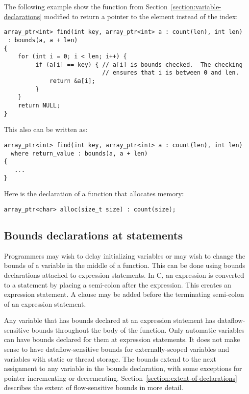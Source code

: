 The following example show the  function from
Section~\ref{section:variable-declarations} modified
to return a pointer to the element instead of the index:

\begin{lstlisting}
array_ptr<int> find(int key, array_ptr<int> a : count(len), int len)
 : bounds(a, a + len)
{
    for (int i = 0; i < len; i++) {
         if (a[i] == key) { // a[i] is bounds checked.  The checking
                            // ensures that i is between 0 and len.
             return &a[i];
         }
    }
    return NULL;
}
\end{lstlisting}

This also can be written as:

\begin{lstlisting}
array_ptr<int> find(int key, array_ptr<int> a : count(len), int len)
  where return_value : bounds(a, a + len)
{
   ...
}
\end{lstlisting}
Here is the declaration of a function that allocates memory:

\begin{lstlisting}
array_ptr<char> alloc(size_t size) : count(size);
\end{lstlisting}



\subsection{Bounds declarations at statements}
\label{section:statement-declarations}

Programmers may wish to delay initializing variables or may wish to
change the bounds of a variable in the middle of a function. This can be
done using bounds declarations attached to expression statements. In C,
an expression is converted to a statement by placing a semi-colon after
the expression. This creates an expression statement. A 
clause may be added before the terminating semi-colon of an expression
statement.

Any variable that has bounds declared at an expression statement has
dataflow-sensitive bounds throughout the body of the function. Only
automatic variables can have bounds declared for them at expression
statements. It does not make sense to have dataflow-sensitive bounds for
externally-scoped variables and variables with static or thread storage.
The bounds extend to the next assignment to any variable in the bounds
declaration, with some exceptions for pointer incrementing or
decrementing. Section~\ref{section:extent-of-declarations}
describes the extent of flow-sensitive bounds
in more detail.

